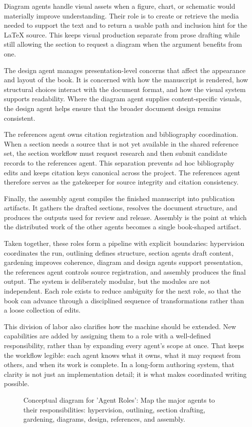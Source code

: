 \documentclass[11pt]{article}
\begin{document}
Diagram agents handle visual assets when a figure, chart, or schematic would materially improve understanding. Their role is to create or retrieve the media needed to support the text and to return a usable path and inclusion hint for the \\LaTeX{} source. This keeps visual production separate from prose drafting while still allowing the section to request a diagram when the argument benefits from one.

The design agent manages presentation-level concerns that affect the appearance and layout of the book. It is concerned with how the manuscript is rendered, how structural choices interact with the document format, and how the visual system supports readability. Where the diagram agent supplies content-specific visuals, the design agent helps ensure that the broader document design remains consistent.

The references agent owns citation registration and bibliography coordination. When a section needs a source that is not yet available in the shared reference set, the section workflow must request research and then submit candidate records to the references agent. This separation prevents ad hoc bibliography edits and keeps citation keys canonical across the project. The references agent therefore serves as the gatekeeper for source integrity and citation consistency.

Finally, the assembly agent compiles the finished manuscript into publication artifacts. It gathers the drafted sections, resolves the document structure, and produces the outputs used for review and release. Assembly is the point at which the distributed work of the other agents becomes a single book-shaped artifact.

Taken together, these roles form a pipeline with explicit boundaries: hypervision coordinates the run, outlining defines structure, section agents draft content, gardening improves coherence, diagram and design agents support presentation, the references agent controls source registration, and assembly produces the final output. The system is deliberately modular, but the modules are not independent. Each role exists to reduce ambiguity for the next role, so that the book can advance through a disciplined sequence of transformations rather than a loose collection of edits.

This division of labor also clarifies how the machine should be extended. New capabilities are added by assigning them to a role with a well-defined responsibility, rather than by expanding every agent's scope at once. That keeps the workflow legible: each agent knows what it owns, what it may request from others, and when its work is complete. In a long-form authoring system, that clarity is not just an implementation detail; it is what makes coordinated writing possible.

\begin{figure}[htbp]
\centering

\caption{Conceptual diagram for 'Agent Roles': Map the major agents to their responsibilities: hypervision, outlining, section drafting, gardening, diagrams, design, references, and assembly.}
\end{figure}
\end{document}
